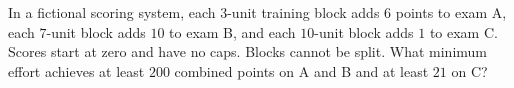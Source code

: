 In a fictional scoring system, each $3$-unit training block adds $6$ points to exam A, each $7$-unit block adds $10$ to exam B, and each $10$-unit block adds $1$ to exam C. Scores start at zero and have no caps. Blocks cannot be split. What minimum effort achieves at least $200$ combined points on A and B and at least $21$ on C?
